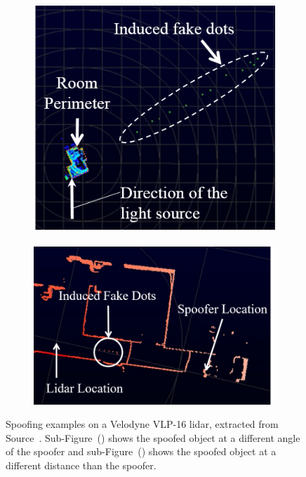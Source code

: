 \begin{figure}[!ht]
	\centering
	\begin{subfigure}[c]{0.4\textwidth}
	\includegraphics[width=\textwidth]{img/lidar/interference_angle_control.png}
\caption{}%
		\label{fig:shinInterferenceAngle}
	\end{subfigure}
	\quad
	\begin{subfigure}[c]{0.55\textwidth}
		\includegraphics[width=\textwidth]{img/lidar/interference_distance_control.png}
	\caption{}%
		\label{fig:shinInterferenceDistance}
	\end{subfigure}
	\caption[Spoofing obstacles on \ac{lidar} at different angles and closer distances that the spoofer.]{Spoofing examples on a Velodyne VLP-16 \ac{lidar}, extracted from Source~\cite{Shin2017}. Sub-Figure~() shows the spoofed object at a different angle of the spoofer and sub-Figure~() shows the spoofed object at a different distance than the spoofer.}
	\label{fig:shinInterference}
\end{figure}


